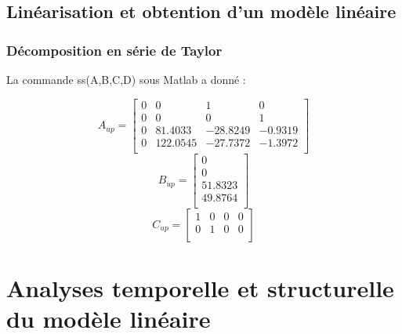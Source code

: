 \documentclass[12pt, a4paper, openany]{report}
\begin{document}
\section{Linéarisation et obtention d'un modèle linéaire}

\subsection{Décomposition en série de Taylor}
 

La commande ss(A,B,C,D) sous Matlab a donné :\\
\begin{center}
 \[
   A_{up}=
  \left[ {\begin{array}{cccc}
   0 & 0 & 1 & 0 \\
    0 & 0 & 0 & 1 \\
     0 & 81.4033 & -28.8249 & -0.9319 \\
      0 & 122.0545 & -27.7372 & -1.3972 \\
  \end{array} } \right]
\]
 \[
   B_{up}=
  \left[ {\begin{array}{c}
   0 \\
   0 \\
   51.8323 \\
   49.8764 \\
  \end{array} } \right]
\]
 \[
   C_{up}=
  \left[ {\begin{array}{cccc}
   1 & 0 & 0 & 0 \\
    0 & 1 & 0 & 0 \\
  \end{array} } \right]
\]
\end{center}



 \chapter{Analyses temporelle et structurelle du modèle linéaire}
 
\end{document}

